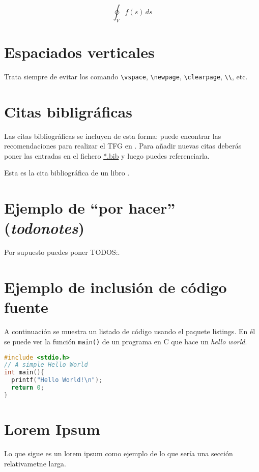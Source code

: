 \begin{displaymath}
  \oint_V f(s) \,ds
\end{displaymath}

\section{Espaciados verticales}

Trata siempre de evitar los comando \verb|\vspace|, \verb|\newpage|, \verb|\clearpage|, \verb|\\|, etc.

\section{Citas bibligráficas}

Las citas bibliográficas se incluyen de esta forma: puede encontrar
las recomendaciones para realizar el TFG en
\cite{recomendaciones}. Para añadir nuevas citas deberás poner las
entradas en el fichero \url{*.bib} y luego puedes referenciarla.

Esta es la cita bibliográfica de un libro \cite{ec}.

\section{Ejemplo de ``por hacer'' (\emph{todonotes})}

Por supuesto puedes poner TODOS:.


\section{Ejemplo de inclusión de código fuente}

A continuación se muestra un listado de código usando el paquete listings. En él se puede ver la función \lstinline{main()} de un programa en C que hace un \emph{hello world}.
\begin{lstlisting}[language=c]
#include <stdio.h>
// A simple Hello World
int main(){
  printf("Hello World!\n");
  return 0;
}
\end{lstlisting}

\section{Lorem Ipsum}
Lo que sigue es un lorem ipsum como ejemplo de lo que sería una sección relativametne larga.

\lipsum


